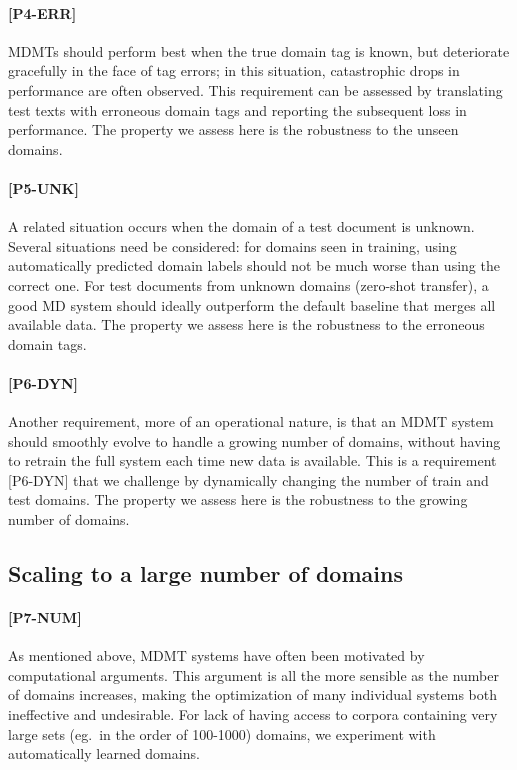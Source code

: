 \paragraph{[P4-ERR]}
MDMTs should perform best when the true domain tag is known, but deteriorate gracefully in the face of tag errors; in this situation, catastrophic drops in performance are often observed. This requirement can be assessed by translating test texts with erroneous domain tags and reporting the subsequent loss in performance. The property we assess here is the robustness to the unseen domains.

\paragraph{[P5-UNK]}
A related situation occurs when the domain of a test document is unknown. Several situations need be considered: for domains seen in training, using automatically predicted domain labels should not be much worse than using the correct one. For test documents from unknown domains (zero-shot transfer), a good MD system should ideally outperform the default baseline that merges all available data. The property we assess here is the robustness to the erroneous domain tags.

\paragraph{[P6-DYN]}
Another requirement, more of an operational nature, is that an MDMT system should smoothly evolve to handle a growing number of domains, without having to retrain the full system each time new data is available. This is a requirement [P6-DYN] that we challenge by dynamically changing the number of train and test domains. The property we assess here is the robustness to the growing number of domains.

\subsection{Scaling to a large number of domains \label{ssec:scaling-chap4}}

\paragraph{[P7-NUM]} As mentioned above, MDMT systems have often been motivated by computational arguments. This argument is all the more sensible as the number of domains increases, making the optimization of many individual systems both ineffective and undesirable. For lack of having access to corpora containing very large sets (eg.\ in the order of 100-1000) domains, we experiment with automatically learned domains.

